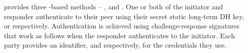 %    
\mEdhoc{} provides three \mStat-based methods -- \mSigStat{}, \mStatStat{} and
\mStatSig{}.
%
One or both of the initiator and responder authenticate to their peer using
their secret static long-term DH key, \mLtki{} or \mLtkr{} respectively.
%
Authentication is achieved using challenge-response signatures that work as
follows when the responder authenticates to the initiator.
%
Each party provides an identifier, \mIdcredi{} and \mIdcredr{} respectively, for the credentials they use.
%

